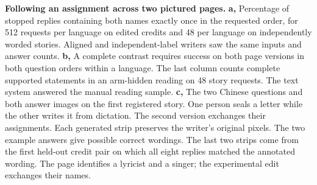 \textbf{Following an assignment across two pictured pages.}
\textbf{a,} Percentage of stopped replies containing both names exactly once in the requested order, for 512 requests per language on edited credits and 48 per language on independently worded stories. Aligned and independent-label writers saw the same inputs and answer counts.
\textbf{b,} A complete contrast requires success on both page versions in both question orders within a language. The last column counts complete supported statements in an arm-hidden reading on 48 story requests. The text system answered the manual reading sample.
\textbf{c,} The two Chinese questions and both answer images on the first registered story. One person seals a letter while the other writes it from dictation. The second version exchanges their assignments. Each generated strip preserves the writer's original pixels. The two example answers give possible correct wordings. The last two strips come from the first held-out credit pair on which all eight replies matched the annotated wording. The page identifies a lyricist and a singer; the experimental edit exchanges their names.
